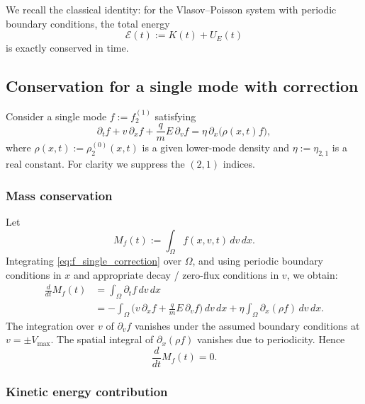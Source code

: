 \documentclass[11pt]{article}
\begin{document}
We recall the classical identity: for the Vlasov--Poisson system with
periodic boundary conditions, the total energy
\[
  \mathcal{E}(t) := K(t) + U_E(t)
\]
is exactly conserved in time.

\subsection{Conservation for a single mode with correction}

Consider a single mode $f := f_2^{(1)}$ satisfying
\begin{equation}
  \partial_t f + v\,\partial_x f
  + \frac{q}{m} E\,\partial_v f
  = \eta\,\partial_x\big(\rho(x,t) f \big),
  \label{eq:f_single_correction}
\end{equation}
where $\rho(x,t) := \rho_2^{(0)}(x,t)$ is a given lower-mode density and
$\eta := \eta_{2,1}$ is a real constant. For clarity we suppress the $(2,1)$
indices.

\subsubsection{Mass conservation}

Let
\[
  M_f(t) := \int_{\Omega} f(x,v,t)\,dv\,dx.
\]
Integrating \eqref{eq:f_single_correction} over $\Omega$, and using periodic
boundary conditions in $x$ and appropriate decay / zero-flux conditions in
$v$, we obtain:
\begin{align*}
  \frac{d}{dt} M_f(t)
  &= \int_{\Omega} \partial_t f\,dv\,dx \\
  &= -\int_{\Omega} \Big(
       v\,\partial_x f + \frac{q}{m} E\,\partial_v f
     \Big)\,dv\,dx
     + \eta \int_{\Omega} \partial_x(\rho f)\,dv\,dx.
\end{align*}
The integration over $v$ of $\partial_v f$ vanishes under the assumed
boundary conditions at $v = \pm V_{\max}$. The spatial integral of
$\partial_x(\rho f)$ vanishes due to periodicity. Hence
\[
  \frac{d}{dt} M_f(t) = 0.
\]

\subsubsection{Kinetic energy contribution}
\end{document}
